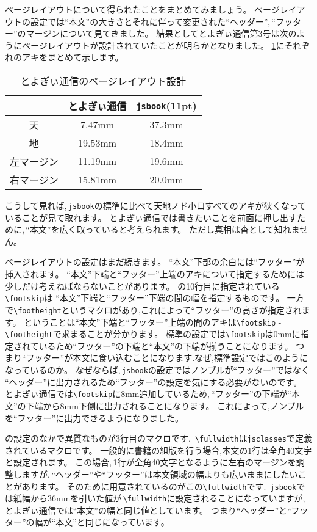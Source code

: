 ページレイアウトについて得られたことをまとめてみましょう。
ページレイアウトの設定では``本文''の大きさとそれに伴って変更された``ヘッダー'',\,``フッター''のマージンについて見てきました。
結果としてとよぎぃ通信第3号は次のようにページレイアウトが設計されていたことが明らかとなりました。
\tablename\ref{tbl:toyogylayout}にそれぞれのアキをまとめて示します。

\begin{table}[!ht]
	\centering
	\caption{とよぎぃ通信のページレイアウト設計}
	\label{tbl:toyogylayout}
	\begin{tabular}{c|c|c} \hline \hline
		& とよぎぃ通信 & \verb|jsbook|(11pt) \\ \hline
		天 & 7.47mm & 37.3mm \\
		地 & 19.53mm & 18.4mm \\
		左マージン & 11.19mm & 19.6mm \\
		右マージン & 15.81mm & 20.0mm \\ \hline
	\end{tabular}
\end{table}

こうして見れば,\,\verb|jsbook|の標準に比べて天地ノド小口すべてのアキが狭くなっていることが見て取れます。
とよぎぃ通信では書きたいことを前面に押し出すために,\,``本文''を広く取っていると考えられます。
ただし真相は杳として知れません。

ページレイアウトの設定はまだ続きます。
``本文''下部の余白には``フッター''が挿入されます。
``本文''下端と``フッター''上端のアキについて指定するためには少しだけ考えねばならないことがあります。
の10行目に指定されている\verb|\footskip|は
``本文''下端と``フッター''下端の間の幅を指定するものです。
一方で\verb|\footheight|というマクロがあり,これによって``フッター''の高さが指定されます。
ということは``本文''下端と``フッター''上端の間のアキは\verb|\footskip| - \verb|\footheight|で求まることが分かります。
標準の設定では\verb|\footskip|は0mmに指定されているため``フッター''の下端と``本文''の下端が揃うことになります。
つまり``フッター''が本文に食い込むことになります.なぜ,標準設定ではこのようになっているのか。
なぜならば,\,\verb|jsbook|の設定ではノンブルが``フッター''ではなく
``ヘッダー''に出力されるため``フッター''の設定を気にする必要がないのです。
とよぎぃ通信では\verb|\footskip|に8mm追加しているため,\,``フッター''の下端が``本文''の下端から8mm下側に出力されることになります。
これによって,ノンブルを``フッター''に出力できるようになりました。

の設定のなかで異質なものが3行目のマクロです.\,
\verb|\fullwidth|は\verb|jsclasses|で定義されているマクロです。
一般的に書籍の組版を行う場合,本文の1行は全角40文字と設定されます。
この場合,\,1行が全角40文字となるように左右のマージンを調整しますが,\,``ヘッダー''や``フッター''は本文領域の幅よりも広いままにしたいことがあります。
そのために用意されているのがこの\verb|\fullwidth|です.\,
\verb|jsbook|では紙幅から36mmを引いた値が\,\verb|\fullwidth|に設定されることになっていますが,とよぎぃ通信では``本文''の幅と同じ値としています。
つまり``ヘッダー''と``フッター''の幅が``本文''と同じになっています。

